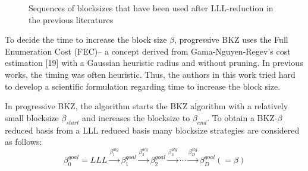 \begin{figure}[h!]
    \caption{Sequences of blocksizes that have been used after LLL-reduction in the previous literatures} %
    \label{fig:BKZ_Blocksize_increase}
\end{figure}





To decide the time to increase the block size $\beta$, progressive BKZ uses the Full Enumeration Cost (FEC)-- a concept derived from Gama-Nguyen-Regev's cost estimation [19] with a Gaussian heuristic radius and without pruning.
In previous works, the timing was often heuristic.
Thus, the authors in this work tried hard to develop a scientific formulation regarding time to increase the block size.

In progressive BKZ, the algorithm starts the BKZ algorithm with a relatively small blocksize $\beta_{start}$ and increases the blocksize to $\beta_{end}$.
To obtain a BKZ-$\beta$ reduced basis from a LLL reduced basis many blocksize strategies are considered as follows:
\begin{equation*}
    \beta_0^{goal}=LLL \xrightarrow{\beta_1^{alg}} \beta_1^{goal} \xrightarrow{\beta_2^{alg}} \beta_2^{goal} \xrightarrow{\beta_3^{alg}} \cdots \xrightarrow{\beta_D^{alg}}  \beta_D^{goal} (=\beta)
\end{equation*}

